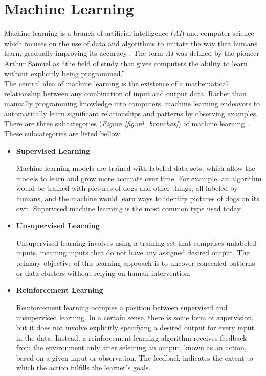 \newpage

\section{Machine Learning}

Machine learning is a branch of artificial intelligence (\textit{AI}) and computer science which focuses on the use of data and algorithms to imitate the way that humans learn, gradually improving its accuracy \cite{IBMMachineLearning}. The term \textit{AI} was defined by the pioneer Arthur Samuel as “the field of study that gives computers the ability to learn without explicitly being programmed.” \\

The central idea of machine learning is the existence of a mathematical relationship between any combination of input and output data. Rather than manually programming knowledge into computers, machine learning endeavors to automatically learn significant relationships and patterns by observing examples. \\

There are three subcategories (\textit{Figure \ref{fig:ml_branches}}) of machine learning \cite{MITML}. These subcategories are listed bellow. \\

\begin{itemize}
\item \textbf{Supervised Learning}

Machine learning models are trained with labeled data sets, which allow the models to learn and grow more accurate over time. For example, an algorithm would be trained with pictures of dogs and other things, all labeled by humans, and the machine would learn ways to identify pictures of dogs on its own. Supervised machine learning is the most common type used today. \\

\item \textbf{Unsupervised Learning}

Unsupervised learning involves using a training set that comprises unlabeled inputs, meaning inputs that do not have any assigned desired output. The primary objective of this learning approach is to uncover concealed patterns or data clusters without relying on human intervention. \\

\item \textbf{Reinforcement Learning}

Reinforcement learning occupies a position between supervised and unsupervised learning. In a certain sense, there is some form of supervision, but it does not involve explicitly specifying a desired output for every input in the data. Instead, a reinforcement learning algorithm receives feedback from the environment only after selecting an output, known as an action, based on a given input or observation. The feedback indicates the extent to which the action fulfills the learner's goals. \\

\end{itemize}

